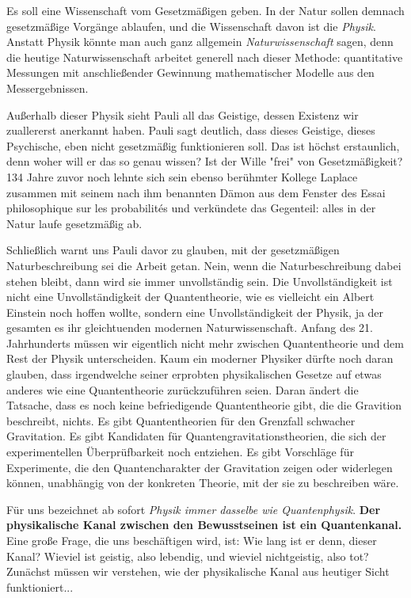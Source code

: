 \documentclass[12pt]{book}
\begin{document}
Es soll eine Wissenschaft vom Gesetzmäßigen geben. In der Natur sollen demnach gesetzmäßige Vorgänge ablaufen, und die Wissenschaft davon ist die \emph{Physik}. Anstatt Physik könnte man auch ganz allgemein \emph{Naturwissenschaft} sagen, denn die heutige Naturwissenschaft arbeitet generell nach dieser Methode: quantitative Messungen mit anschließender Gewinnung mathematischer Modelle aus den Messergebnissen.

Außerhalb dieser Physik sieht Pauli all das Geistige, dessen Existenz wir zuallererst anerkannt haben. Pauli sagt deutlich, dass dieses Geistige, dieses Psychische, eben nicht gesetzmäßig funktionieren soll. Das ist höchst erstaunlich, denn woher will er das so genau wissen? Ist der Wille "frei" von Gesetzmäßigkeit? 134 Jahre zuvor noch lehnte sich sein ebenso berühmter Kollege Laplace zusammen mit seinem nach ihm benannten Dämon aus dem Fenster des Essai philosophique sur les probabilités und verkündete das Gegenteil: alles in der Natur laufe gesetzmäßig ab.

Schließlich warnt uns Pauli davor zu glauben, mit der gesetzmäßigen Naturbeschreibung sei die Arbeit getan. Nein, wenn die Naturbeschreibung dabei stehen bleibt, dann wird sie immer unvollständig sein. Die Unvollständigkeit ist nicht eine Unvollständigkeit der Quantentheorie, wie es vielleicht ein Albert Einstein noch hoffen wollte, sondern eine Unvollständigkeit der Physik, ja der gesamten es ihr gleichtuenden modernen Naturwissenschaft. Anfang des 21. Jahrhunderts müssen wir eigentlich nicht mehr zwischen Quantentheorie und dem Rest der Physik unterscheiden. Kaum ein moderner Physiker dürfte noch daran glauben, dass irgendwelche seiner erprobten physikalischen Gesetze auf etwas anderes wie eine Quantentheorie zurückzuführen seien. Daran ändert die Tatsache, dass es noch keine befriedigende Quantentheorie gibt, die die Gravition beschreibt, nichts. Es gibt Quantentheorien für den Grenzfall schwacher Gravitation. Es gibt Kandidaten für Quantengravitationstheorien, die sich der experimentellen Überprüfbarkeit noch entziehen. Es gibt Vorschläge für Experimente, die den Quantencharakter der Gravitation zeigen oder widerlegen können, unabhängig von der konkreten Theorie, mit der sie zu beschreiben wäre. 

Für uns bezeichnet ab sofort \emph{Physik immer dasselbe wie Quantenphysik}. \textbf{Der physikalische Kanal zwischen den Bewusstseinen ist ein Quantenkanal.} Eine große Frage, die uns beschäftigen wird, ist: Wie lang ist er denn, dieser Kanal? Wieviel ist geistig, also lebendig, und wieviel nichtgeistig, also tot? Zunächst müssen wir verstehen, wie der physikalische Kanal aus heutiger Sicht funktioniert...
\end{document}
